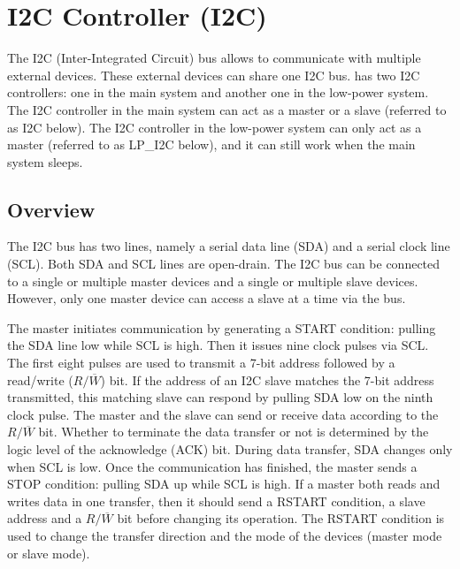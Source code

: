 \documentclass[main\_\_EN.tex]{subfiles}
\begin{document}

\ifglobal
\else
    {\let\clearpage\relax \listoftodos}
    {\let\clearpage\relax \listofdonetodos}
    \tableofcontents
\fi








\hypertarget{i2c}{}
\chapter{I2C Controller (I2C)}
\label{mod:i2c}


The I2C (Inter-Integrated Circuit) bus allows \chipname{} to communicate with multiple external devices. These external devices can share one I2C bus.
\chipname{} has two I2C controllers: one in the main system and another one in the low-power system. The I2C controller in the main system can act as a master or a slave (referred to as I2C below). The I2C controller in the low-power system can only act as a master (referred to as LP\_I2C below), and it can still work when the main system sleeps.


\section{Overview}
The I2C bus has two lines, namely a serial data line (SDA) and a serial clock line (SCL). Both SDA and SCL lines are open-drain. The I2C bus can be connected to a single or multiple master devices and a single or multiple slave devices. However, only one master device can access a slave at a time via the bus.

The master initiates communication by generating a START condition: pulling the SDA line low while SCL is high. Then it issues nine clock pulses via SCL. The first eight pulses are used to transmit a 7-bit address followed by a read/write ($R/\overline W$) bit. If the address of an I2C slave matches the 7-bit address transmitted, this matching slave can respond by pulling SDA low on the ninth clock pulse. The master and the slave can send or receive data according to the $R/\overline W$ bit. Whether to terminate the data transfer or not is determined by the logic level of the acknowledge (ACK) bit. During data transfer, SDA changes only when SCL is low. Once the communication has finished, the master sends a STOP condition: pulling SDA up while SCL is high. If a master both reads and writes data in one transfer, then it should send a RSTART condition, a slave address and a $R/\overline W$ bit before changing its operation. The RSTART condition is used to change the transfer direction and the mode of the devices (master mode or slave mode).
\end{document}
